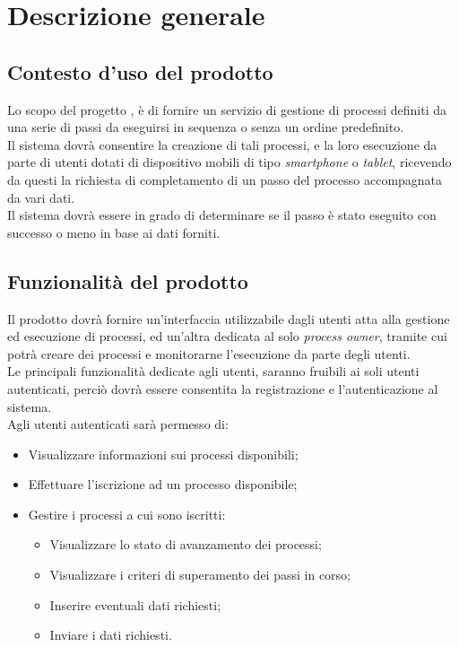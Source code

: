 \section{Descrizione generale}

\subsection{Contesto d'uso del prodotto}
Lo scopo del progetto \progetto{}, è di fornire un servizio di gestione di processi definiti da una serie di passi da eseguirsi in sequenza o senza un ordine predefinito.\\
Il sistema dovrà consentire la creazione di tali processi, e la loro esecuzione da parte di utenti dotati di dispositivo mobili di tipo \textit{smartphone} o \textit{tablet}, ricevendo da questi la richiesta di completamento di un passo del processo accompagnata da vari dati.\\
Il sistema dovrà essere in grado di determinare se il passo è stato eseguito con successo o meno in base ai dati forniti.

\subsection{Funzionalità del prodotto}
Il prodotto dovrà fornire un'interfaccia utilizzabile dagli utenti atta alla gestione ed esecuzione di processi, ed un'altra dedicata al solo \textit{process owner}, tramite cui potrà creare dei processi e monitorarne l'esecuzione da parte degli utenti.\\
Le principali funzionalità dedicate agli utenti, saranno fruibili ai soli utenti autenticati, perciò dovrà essere consentita la registrazione e l'autenticazione al sistema.\\
Agli utenti autenticati sarà permesso di:

\begin{itemize}
\item Visualizzare informazioni sui processi disponibili;
\item Effettuare l'iscrizione ad un processo disponibile;
\item Gestire i processi a cui sono iscritti:
\begin{itemize}
\item Visualizzare lo stato di avanzamento dei processi;
\item Visualizzare i criteri di superamento dei passi in corso;
\item Inserire eventuali dati richiesti;
\item Inviare i dati richiesti.
\end{itemize}
\end{itemize}

